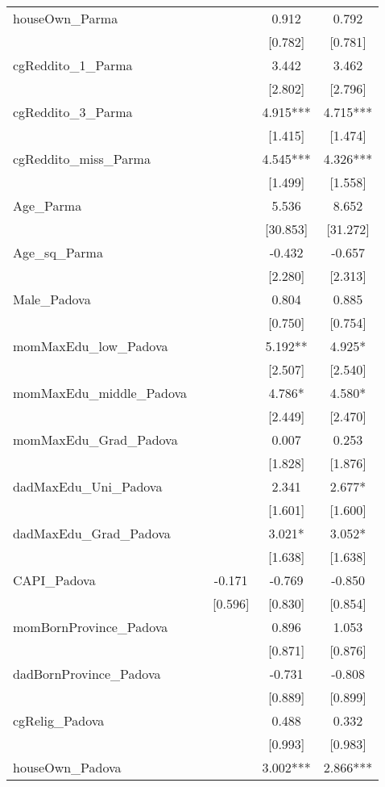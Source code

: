 \documentclass[]{article}
\begin{document}
\begin{tabular}{lcccc}
houseOwn\_Parma &  &  & 0.912 & 0.792 \\
 &  &  & [0.782] & [0.781] \\
cgReddito\_1\_Parma &  &  & 3.442 & 3.462 \\
 &  &  & [2.802] & [2.796] \\
cgReddito\_3\_Parma &  &  & 4.915*** & 4.715*** \\
 &  &  & [1.415] & [1.474] \\
cgReddito\_miss\_Parma &  &  & 4.545*** & 4.326*** \\
 &  &  & [1.499] & [1.558] \\
Age\_Parma &  &  & 5.536 & 8.652 \\
 &  &  & [30.853] & [31.272] \\
Age\_sq\_Parma &  &  & -0.432 & -0.657 \\
 &  &  & [2.280] & [2.313] \\
Male\_Padova &  &  & 0.804 & 0.885 \\
 &  &  & [0.750] & [0.754] \\
momMaxEdu\_low\_Padova &  &  & 5.192** & 4.925* \\
 &  &  & [2.507] & [2.540] \\
momMaxEdu\_middle\_Padova &  &  & 4.786* & 4.580* \\
 &  &  & [2.449] & [2.470] \\
momMaxEdu\_Grad\_Padova &  &  & 0.007 & 0.253 \\
 &  &  & [1.828] & [1.876] \\
dadMaxEdu\_Uni\_Padova &  &  & 2.341 & 2.677* \\
 &  &  & [1.601] & [1.600] \\
dadMaxEdu\_Grad\_Padova &  &  & 3.021* & 3.052* \\
 &  &  & [1.638] & [1.638] \\
CAPI\_Padova &  & -0.171 & -0.769 & -0.850 \\
 &  & [0.596] & [0.830] & [0.854] \\
momBornProvince\_Padova &  &  & 0.896 & 1.053 \\
 &  &  & [0.871] & [0.876] \\
dadBornProvince\_Padova &  &  & -0.731 & -0.808 \\
 &  &  & [0.889] & [0.899] \\
cgRelig\_Padova &  &  & 0.488 & 0.332 \\
 &  &  & [0.993] & [0.983] \\
houseOwn\_Padova &  &  & 3.002*** & 2.866*** \\

\end{tabular}
\end{document}
